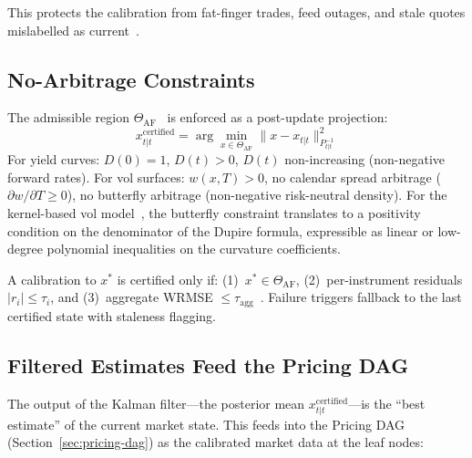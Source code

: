 \documentclass[11pt,a4paper]{article}
\begin{document}
This protects the calibration from fat-finger trades, feed outages, and stale quotes mislabelled as current~\cite[A7]{calibration_manifesto}.

\subsection{No-Arbitrage Constraints}

The admissible region $\Theta_{\text{AF}}$~\cite[\S5]{calibration_manifesto} is enforced as a post-update projection:
\begin{equation}
x_{t|t}^{\text{certified}} = \arg\min_{x \in \Theta_{\text{AF}}} \|x - x_{t|t}\|_{P_{t|t}^{-1}}^2
\end{equation}
For yield curves: $D(0) = 1$, $D(t) > 0$, $D(t)$ non-increasing (non-negative forward rates).  For vol surfaces: $w(x,T) > 0$, no calendar spread arbitrage ($\partial w / \partial T \geq 0$), no butterfly arbitrage (non-negative risk-neutral density).  For the kernel-based vol model~\cite{implied_local_vol}, the butterfly constraint translates to a positivity condition on the denominator of the Dupire formula, expressible as linear or low-degree polynomial inequalities on the curvature coefficients.

A calibration to $x^*$ is certified only if: (1)~$x^* \in \Theta_{\text{AF}}$, (2)~per-instrument residuals $|r_i| \leq \tau_i$, and (3)~aggregate WRMSE $\leq \tau_{\text{agg}}$~\cite[A4]{calibration_manifesto}.  Failure triggers fallback to the last certified state with staleness flagging.

\subsection{Filtered Estimates Feed the Pricing DAG}

The output of the Kalman filter---the posterior mean $x_{t|t}^{\text{certified}}$---is the ``best estimate'' of the current market state.  This feeds into the Pricing DAG (Section~\ref{sec:pricing-dag}) as the calibrated market data at the leaf nodes:

\begin{center}
\end{center}
\end{document}
